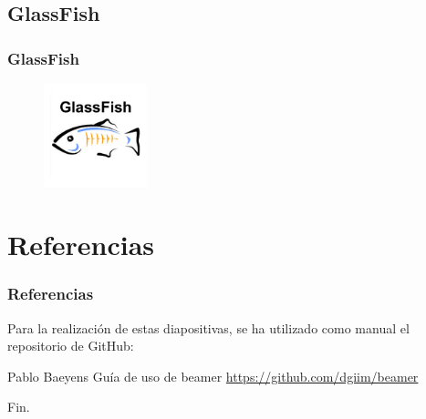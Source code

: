 \documentclass[12pt, aspectratio=169]{beamer} %
\begin{document}
	\subsection{GlassFish}
		\begin{frame}
			\frametitle{GlassFish}
			
			\begin{figure}
				\includegraphics[width=3cm]{GlassFish_logo.jpg}
			\end{figure}
		\end{frame}

\section{Referencias}
	\begin{frame}[allowframebreaks]
		\frametitle{Referencias}
		Para la realización de estas diapositivas, se ha utilizado como manual el
		repositorio de GitHub:
		
		\footnotesize{
		  \begin{thebibliography}{7} %
		    \bibitem[Pbaeyens]{} Pablo Baeyens
		      \newblock Guía de uso de beamer
		      \newblock \url{https://github.com/dgiim/beamer}
		  \end{thebibliography}
		}
	\end{frame}


\begin{frame}
\Huge{\centerline{Fin.}}
\end{frame}

\end{document}
